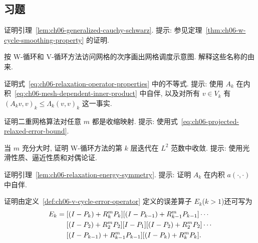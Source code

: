 \subsection{习题}
\label{sec:ch06-exercises}
\setcounter{exerciseitem}{0}

\begin{MBExercise}
\label{exr:ch06-01}
证明引理~\ref{lem:ch06-generalized-cauchy-schwarz}. 提示: 参见定理~\ref{thm:ch06-w-cycle-smoothing-property} 的证明.
\end{MBExercise}

\begin{MBExercise}
\label{exr:ch06-02}
按 W-循环和 V-循环方法访问网格的次序画出网格调度示意图. 解释这些名称的由来.
\end{MBExercise}

\begin{MBExercise}
\label{exr:ch06-03}
证明式~\eqref{eq:ch06-relaxation-operator-properties} 中的不等式. 提示: 使用 $A_k$ 在内积~\eqref{eq:ch06-mesh-dependent-inner-product} 中自伴, 以及对所有 $v\in V_k$ 有 $(A_kv,v)_k\leq\Lambda_k(v,v)_k$ 这一事实.
\end{MBExercise}

\begin{MBExercise}
\label{exr:ch06-04}
证明二重网格算法对任意 $m$ 都是收缩映射. 提示: 使用式~\eqref{eq:ch06-projected-relaxed-error-bound}.
\end{MBExercise}

\begin{MBExercise}
\label{exr:ch06-05}
当 $m$ 充分大时, 证明 W-循环方法的第 $k$ 层迭代在 $L^2$ 范数中收敛. 提示: 使用光滑性质、逼近性质和对偶论证.
\end{MBExercise}

\begin{MBExercise}
\label{exr:ch06-06}
证明引理~\ref{lem:ch06-relaxation-energy-symmetry}. 提示: 证明 $A_k$ 在内积 $a(\cdot,\cdot)$ 中自伴.
\end{MBExercise}

\begin{MBExercise}
\label{exr:ch06-07}
证明由定义~\ref{def:ch06-v-cycle-error-operator} 定义的误差算子 $E_k$($k>1$)还可写为
\[
\MathBookFormulaID{formula-ch06-exercise-07-symmetric-v-cycle-product}
\begin{aligned}
E_k={}&[(I-P_k)+R_k^mP_k][(I-P_{k-1})+R_{k-1}^mP_{k-1}]\cdots\\
&[(I-P_2)+R_2^mP_2][I-P_1][(I-P_2)+R_2^mP_2]\cdots\\
&[(I-P_{k-1})+R_{k-1}^mP_{k-1}][(I-P_k)+R_k^mP_k].
\end{aligned}
\]
\end{MBExercise}

